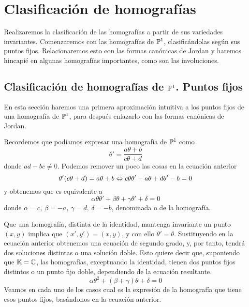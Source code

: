 \chapter{Clasificación de homografías}
Realizaremos la clasificación de las homografías a partir de sus variedades invariantes. Comenzaremos con las homografías de $\mathbb{P}^1$, clasificándolas según sus puntos fijos. Relacionaremos esto con las formas canónicas de Jordan y haremos hincapié en algunas homografías importantes, como son las involuciones.

\section{Clasificación de homografías de $\mathbb{P}^1$. Puntos fijos}
En esta sección haremos una primera aproximación intuitiva a los puntos fijos de una homografía de $\mathbb{P}^1$, para después enlazarlo con las formas canónicas de Jordan.

Recordemos que podíamos expresar una homografía de $\mathbb{P}^1$ como
\begin{equation}
	\label{C6_transformada_moebius}
	\theta'=\frac{a\theta+b}{c\theta +d}
\end{equation}
donde $ad-bc\not=0$. Podemos remover un poco las cosas en la ecuación anterior
\begin{equation}
	\theta'(c\theta+d)=a\theta+b\Leftrightarrow c\theta\theta'-a\theta+d\theta'-b=0
\end{equation}
y obtenemos que es equivalente a 
\begin{equation}
	\label{C6_eq_homografia_segundo_orden}
	\alpha\theta\theta'+\beta\theta+\gamma\theta'+\delta=0
\end{equation}
donde $\alpha=c, \ \beta=-a, \ \gamma=d, \ \delta=-b$, denominada  o  de la homografía.

Que una homografía, distinta de la identidad, mantenga invariante un punto $(x,y)$ implica que $(x',y')=(x,y)$, y con ello $\theta'=\theta$. Sustituyendo en la ecuación anterior obtenemos una ecuación de segundo grado, y, por tanto, tendrá dos soluciones distintas o una solución doble. Esto quiere decir que, suponiendo que $\mathbb{K}=\mathbb{C}$, las homografías, exceptuando la identidad, tienen dos puntos fijos distintos o un punto fijo doble, dependiendo de la ecuación resultante.
\begin{equation}
	\label{C6_eq_homografia_segundo_orden_punto_fijo}
	\alpha\theta^2+(\beta+\gamma)\theta+\delta=0
\end{equation}
Veamos en cada uno de los casos cual es la expresión de la homografía que tiene esos puntos fijos, basándonos en la ecuación anterior.

